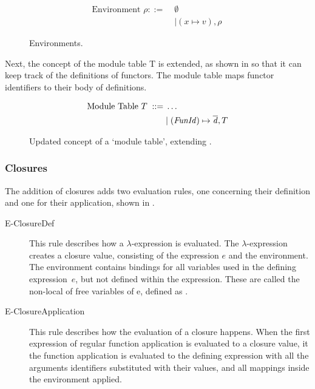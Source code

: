 \begin{figure}[htb]
\begin{align*}
\text{Environment }\rho ::=\;& \emptyset \\
&| (x \mapsto v), \rho\ 
\end{align*}
\caption[Environment entity]{Environments.\label{fig:Environments}}
\end{figure}

Next, the concept of the module table T is extended, as shown in  so that it can keep track of the definitions of functors.
The module table maps functor identifiers to their body of definitions.

\begin{figure}[htb]
\begin{align*}
\text{Module Table } T\; ::= \;& \ldots \\
&| \; \mathit{(FunId) \mapsto \overline{d}}, T
\end{align*}
\caption[Updated Module Table Concept]{Updated concept of a `module table', extending .\label{fig:UpdatedModuleTable}}
\end{figure}

\subsubsection{Closures}
The addition of closures adds two evaluation rules, one concerning their definition and one for their application, shown in .
\begin{description}
\item[E-ClosureDef]
This rule describes how a $\lambda$-expression is evaluated.
The $\lambda$-expression creates a closure value, consisting of the expression $e$ and the environment.
The environment contains bindings for all variables used in the defining expression~$e$, but not defined within the expression. These are called the non-local of free variables of e, defined as .
\item[E-ClosureApplication]
This rule describes how the evaluation of a closure happens.
When the first expression of regular function application is evaluated to a closure value, it the function application is evaluated to the defining expression with all the arguments identifiers substituted with their values, and all mappings inside the environment applied.
\end{description}


